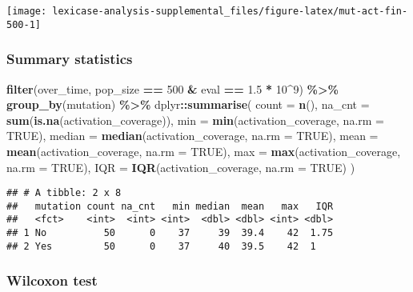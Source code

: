 \documentclass[
]{book}
\newenvironment{Shaded}{\begin{snugshade}}{\end{snugshade}}
\newcommand{\AttributeTok}[1]{\textcolor[rgb]{0.13,0.29,0.53}{#1}}
\newcommand{\ConstantTok}[1]{\textcolor[rgb]{0.56,0.35,0.01}{#1}}
\newcommand{\DecValTok}[1]{\textcolor[rgb]{0.00,0.00,0.81}{#1}}
\newcommand{\FloatTok}[1]{\textcolor[rgb]{0.00,0.00,0.81}{#1}}
\newcommand{\FunctionTok}[1]{\textcolor[rgb]{0.13,0.29,0.53}{\textbf{#1}}}
\newcommand{\NormalTok}[1]{#1}
\newcommand{\SpecialCharTok}[1]{\textcolor[rgb]{0.81,0.36,0.00}{\textbf{#1}}}
\begin{document}
\texttt{[image: lexicase-analysis-supplemental\_files/figure-latex/mut-act-fin-500-1]}

\hypertarget{summary-statistics-4}{%
\subsubsection{Summary statistics}\label{summary-statistics-4}}

\begin{Shaded}
\begin{Highlighting}[]
\FunctionTok{filter}\NormalTok{(over\_time, pop\_size }\SpecialCharTok{==} \DecValTok{500} \SpecialCharTok{\&}\NormalTok{ eval }\SpecialCharTok{==} \FloatTok{1.5} \SpecialCharTok{*} \DecValTok{10}\SpecialCharTok{\^{}}\DecValTok{9}\NormalTok{) }\SpecialCharTok{\%\textgreater{}\%}
  \FunctionTok{group\_by}\NormalTok{(mutation) }\SpecialCharTok{\%\textgreater{}\%}
\NormalTok{  dplyr}\SpecialCharTok{::}\FunctionTok{summarise}\NormalTok{(}
    \AttributeTok{count =} \FunctionTok{n}\NormalTok{(),}
    \AttributeTok{na\_cnt =} \FunctionTok{sum}\NormalTok{(}\FunctionTok{is.na}\NormalTok{(activation\_coverage)),}
    \AttributeTok{min =} \FunctionTok{min}\NormalTok{(activation\_coverage, }\AttributeTok{na.rm =} \ConstantTok{TRUE}\NormalTok{),}
    \AttributeTok{median =} \FunctionTok{median}\NormalTok{(activation\_coverage, }\AttributeTok{na.rm =} \ConstantTok{TRUE}\NormalTok{),}
    \AttributeTok{mean =} \FunctionTok{mean}\NormalTok{(activation\_coverage, }\AttributeTok{na.rm =} \ConstantTok{TRUE}\NormalTok{),}
    \AttributeTok{max =} \FunctionTok{max}\NormalTok{(activation\_coverage, }\AttributeTok{na.rm =} \ConstantTok{TRUE}\NormalTok{),}
    \AttributeTok{IQR =} \FunctionTok{IQR}\NormalTok{(activation\_coverage, }\AttributeTok{na.rm =} \ConstantTok{TRUE}\NormalTok{)}
\NormalTok{  )}
\end{Highlighting}
\end{Shaded}

\begin{verbatim}
## # A tibble: 2 x 8
##   mutation count na_cnt   min median  mean   max   IQR
##   <fct>    <int>  <int> <int>  <dbl> <dbl> <int> <dbl>
## 1 No          50      0    37     39  39.4    42  1.75
## 2 Yes         50      0    37     40  39.5    42  1
\end{verbatim}

\hypertarget{wilcoxon-test-1}{%
\subsubsection{Wilcoxon test}\label{wilcoxon-test-1}}
\end{document}
